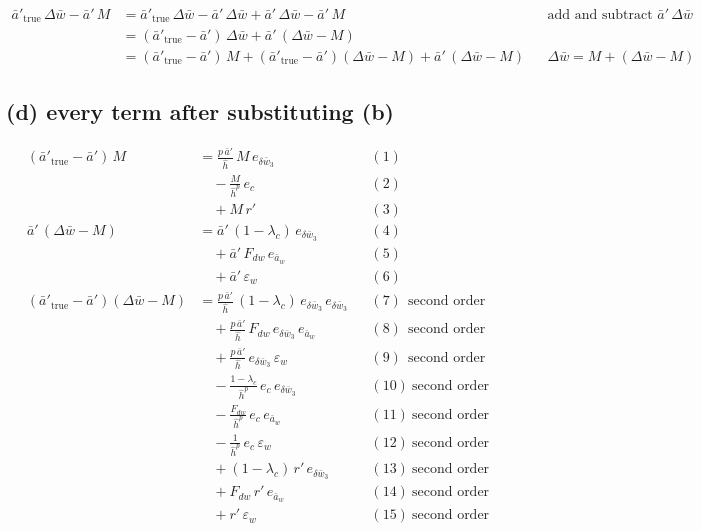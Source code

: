 \documentclass[11pt,a4paper,fontset=none]{ctexart}
\newcommand{\ba}{\bar{a}}
\newcommand{\bw}{\bar{w}}
\newcommand{\dW}{\Delta\bw}
\newcommand{\ap}{\ba'}
\newcommand{\hh}{\hat{h}}
\begin{document}
\begin{align*}
\ap_{\mathrm{true}}\,\dW - \ap\,M
  &= \ap_{\mathrm{true}}\,\dW - \ap\,\dW + \ap\,\dW - \ap\,M                     && \text{add and subtract } \ap\,\dW \\
  &= (\ap_{\mathrm{true}} - \ap)\,\dW + \ap\,(\dW - M) \\
  &= (\ap_{\mathrm{true}} - \ap)\,M + (\ap_{\mathrm{true}} - \ap)(\dW - M) + \ap\,(\dW - M)
                                                                                 && \dW = M + (\dW - M)
\end{align*}

\subsection*{(d) every term after substituting (b)}

\begin{align*}
(\ap_{\mathrm{true}} - \ap)\,M
  &= \frac{p\,\ap}{\hh}\,M\,e_{\delta\bw_3}                                      && (1) \\
  &\quad - \frac{M}{\hh^{p}}\,e_c                                                && (2) \\
  &\quad + M\,r'                                                                 && (3) \\[6pt]
\ap\,(\dW - M)
  &= \ap\,(1-\lambda_c)\,e_{\delta\bw_3}                                         && (4) \\
  &\quad + \ap\,F_{dw}\,e_{\ba_w}                                                && (5) \\
  &\quad + \ap\,\varepsilon_w                                                    && (6) \\[6pt]
(\ap_{\mathrm{true}} - \ap)(\dW - M)
  &= \frac{p\,\ap}{\hh}\,(1-\lambda_c)\,e_{\delta\bw_3}\,e_{\delta\bw_3}          && (7)\ \ \text{second order} \\
  &\quad + \frac{p\,\ap}{\hh}\,F_{dw}\,e_{\delta\bw_3}\,e_{\ba_w}                 && (8)\ \ \text{second order} \\
  &\quad + \frac{p\,\ap}{\hh}\,e_{\delta\bw_3}\,\varepsilon_w                     && (9)\ \ \text{second order} \\
  &\quad - \frac{1-\lambda_c}{\hh^{p}}\,e_c\,e_{\delta\bw_3}                      && (10)\ \text{second order} \\
  &\quad - \frac{F_{dw}}{\hh^{p}}\,e_c\,e_{\ba_w}                                 && (11)\ \text{second order} \\
  &\quad - \frac{1}{\hh^{p}}\,e_c\,\varepsilon_w                                  && (12)\ \text{second order} \\
  &\quad + (1-\lambda_c)\,r'\,e_{\delta\bw_3}                                     && (13)\ \text{second order} \\
  &\quad + F_{dw}\,r'\,e_{\ba_w}                                                  && (14)\ \text{second order} \\
  &\quad + r'\,\varepsilon_w                                                      && (15)\ \text{second order}
\end{align*}
\end{document}
